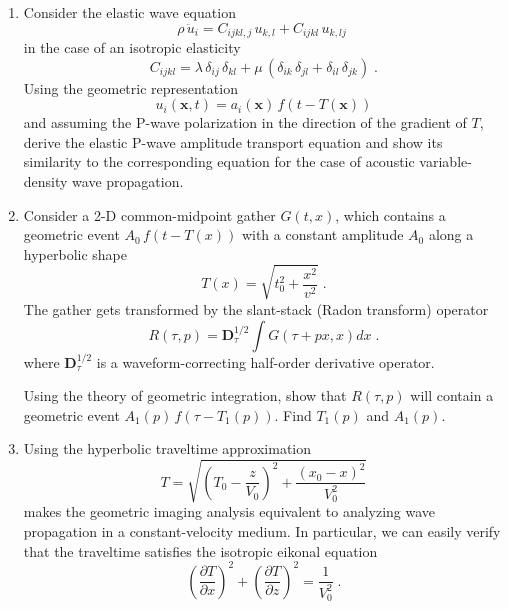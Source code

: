 \begin{enumerate}
\item Consider the elastic wave equation
\begin{equation}
  \label{eq:ewave}
  \rho\,\ddot{u}_i = C_{ijkl,j}\,u_{k,l} + C_{ijkl}\,u_{k,lj}\;
\end{equation}
in the case of an isotropic elasticity
\begin{equation}
  \label{eq:lame}
  C_{ijkl} = \lambda\,\delta_{ij}\,\delta_{kl} + 
  \mu\,(\delta_{ik}\,\delta_{jl} + \delta_{il}\,\delta_{jk})\;.
\end{equation}
Using the geometric representation
\begin{equation}
  u_i(\mathbf{x},t) = a_i(\mathbf{x})\,f\left(t-T(\mathbf{x})\right)
  \label{eq:gwave}
\end{equation}
and assuming the P-wave polarization in the direction of the gradient
of $T$, derive the elastic P-wave amplitude transport equation and
show its similarity to the corresponding equation for the case of
acoustic variable-density wave propagation.
\item Consider a 2-D common-midpoint gather $G(t,x)$, which
  contains a geometric event $A_0\,f\left(t-T(x)\right)$ with a
  constant amplitude $A_0$ along a hyperbolic shape
\begin{equation}
\label{eq:hyper}
T(x) = \sqrt{t_0^2+\frac{x^2}{v^2}}\;.
\end{equation}
The gather gets transformed by the slant-stack (Radon transform) operator
\begin{equation}
\label{eq:radon}
R(\tau,p) = \mathbf{D}_\tau^{1/2} \int G(\tau + p x, x) d x\;.
\end{equation}
where $ \mathbf{D}_\tau^{1/2}$ is a waveform-correcting half-order
derivative operator.

Using the theory of geometric integration, show that $R(\tau,p)$
will contain a geometric event $A_1(p)\,f\left(\tau-T_1(p)\right)$.
Find $T_1(p)$ and $A_1(p)$.

\item Using the hyperbolic traveltime approximation
\begin{equation}
T = \sqrt{\left(T_0-\frac{z}{V_0}\right)^2 + \frac{(x_0-x)^2}{V_0^2}}
\end{equation}
makes the geometric imaging analysis equivalent to analyzing wave
propagation in a constant-velocity medium. In particular, we can easily
verify that the traveltime satisfies the isotropic eikonal equation 
\begin{equation}
\left(\frac{\partial T}{\partial x}\right)^2 + \left(\frac{\partial T}{\partial z}\right)^2 = \frac{1}{V_0^2}\;.
\end{equation}


\end{enumerate}
